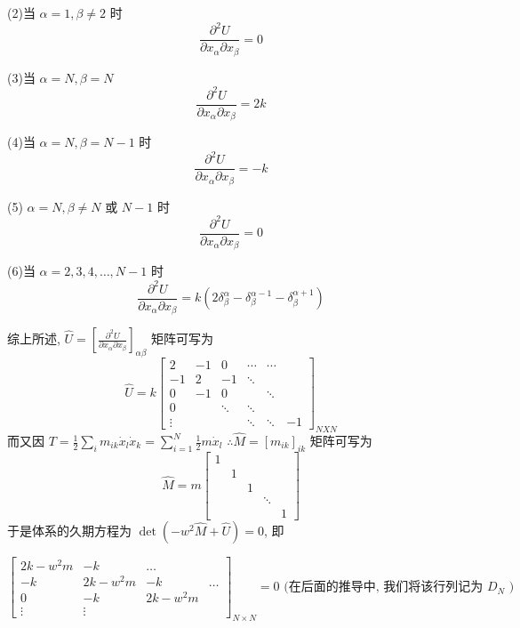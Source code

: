 \documentclass[11pt, a4paper, oneside]{ctexart}
\begin{document}
{{{\begin{appendices}
{(2)当 $\alpha=1, \beta \neq 2$ 时
$$
\frac{\partial^{2} U}{\partial x_{\alpha} \partial x_{\beta}}=0
$$

(3)当 $\alpha=N, \beta=N$
$$
\frac{\partial^{2} U}{\partial x_{\alpha} \partial x_{\beta}}=2 k
$$

(4)当 $\alpha=N, \beta=N-1$ 时
$$
\frac{\partial^{2} U}{\partial x_{\alpha} \partial x_{\beta}}=-k
$$

(5) $\alpha=N, \beta \neq N$ 或 $N-1$ 时
$$
\frac{\partial^{2} U}{\partial x_{\alpha} \partial x_{\beta}}=0
$$

(6)当 $\alpha=2,3,4, \ldots, N-1$ 时
$$
\frac{\partial^{2} U}{\partial x_{\alpha} \partial x_{\beta}}=k\left(2 \delta_{\beta}^{\alpha}-\delta_{\beta}^{\alpha-1}-\delta_{\beta}^{\alpha+1}\right)
$$

综上所述, $\hat{U}=\left[\frac{\partial^{2} U}{\partial x_{\alpha} \partial x_{\beta}}\right]_{\alpha \beta}$ 矩阵可写为
$$
\hat{U}=k\left[\begin{array}{cccccc}
2 & -1 & 0 & \cdots & \cdots & \\
-1 & 2 & -1 & \ddots & & \\
0 & -1 & 0 & & \ddots & \\
0 & & \ddots & \ddots & & \\
\vdots & & & \ddots & \ddots & -1
\end{array}\right]_{N X N}
$$
而又因 $T=\frac{1}{2} \sum_{i} m_{i k} \dot{x}_{l} \dot{x}_{k}=\sum_{i=1}^{N} \frac{1}{2} m \dot{x}_{l}$
$\therefore \hat{M}=\left[m_{i k}\right]_{i k}$ 矩阵可写为
$$
\hat{M}=m\left[\begin{array}{ccccc}
1 & & & & \\
& 1 & & & \\
& & 1 & & \\
& & & \ddots & \\
& & & & 1
\end{array}\right]
$$
于是体系的久期方程为 $\operatorname{det}\left(-w^{2} \hat{M}+\hat{U}\right)=0$, 即

$$
\left[\begin{array}{cccc}
2 k-w^{2} m & -k & \ldots & \\
-k & 2 k-w^{2} m & -k & \ldots \\
0 & -k & 2 k-w^{2} m & \\
\vdots & \vdots & &
\end{array}\right]_{N \times N}=0 \text { (在后面的推导中, 我们将该行列记为 } D_{N} \text { ) }
$$

}
\end{appendices}}}}
\end{document}
